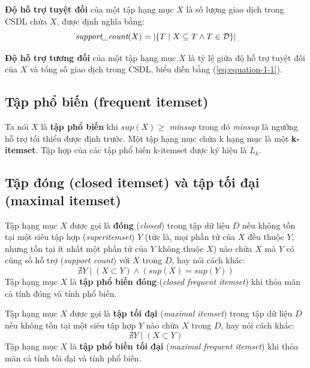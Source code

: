 \textbf{Độ hỗ trợ tuyệt đối} của một tập hạng mục $X$ là số lượng giao dịch trong CSDL chứa $X$, được định nghĩa bằng:
\begin{equation}
    \label{eq:equation-1-2}
    \textit{support\textunderscore count}(X) = |\{T \mid X \subseteq T \land T \in \mathcal{D}\}|
\end{equation}

\textbf{Độ hỗ trợ tương đối} của một tập hạng mục $X$ là tỷ lệ giữa độ hỗ trợ tuyệt đối của $X$ và tổng số giao dịch trong CSDL, biểu diễn bằng (\ref{eq:equation-1-1}).

\subsection{Tập phổ biến (frequent itemset)}
Ta nói $X$ là \textbf{tập phổ biến} khi $\textit{sup}(X) \geq $ \textit{minsup} trong đó \textit{minsup} là ngưỡng hỗ trợ tối thiểu được định trước. Một tập hạng mục chứa k hạng mục là một \textbf{k-itemset}. Tập hợp của các tập phổ biến k-itemset được ký hiệu là $L_k$.

\subsection{Tập đóng (closed itemset) và tập tối đại (maximal itemset)}
Tập hạng mục $X$ được gọi là \textbf{đóng} (\textit{closed}) trong tập dữ liệu $D$ nếu không tồn tại một siêu tập hợp (\textit{superitemset}) $Y$ (tức là, mọi phần tử của $X$ đều thuộc $Y$, nhưng tồn tại ít nhất một phần tử của $Y$ không thuộc $X$) nào chứa $X$ mà $Y$ có cùng số hỗ trợ (\textit{support count}) với $X$ trong $D$, hay nói cách khác:
\begin{equation}
    \label{eq:equation-1-3}
    \nexists Y \mid (X \subset Y) \land (\textit{sup}(X) = \textit{sup}(Y))
\end{equation}
Tập hạng mục $X$ là \textbf{tập phổ biến đóng} (\textit{closed frequent itemset}) khi thỏa mãn cả tính đóng và tính phổ biến.

Tập hạng mục $X$ được gọi là \textbf{tập tối đại} (\textit{maximal itemset}) trong tập dữ liệu $D$ nếu không tồn tại một siêu tập hợp $Y$ nào chứa $X$ trong $D$, hay nói cách khác:
\begin{equation}
    \label{eq:equation-1-4}
    \nexists Y \mid (X \subset Y)
\end{equation}
Tập hạng mục $X$ là \textbf{tập phổ biến tối đại} (\textit{maximal frequent itemset}) khi thỏa mãn cả tính tối đại và tính phổ biến.

